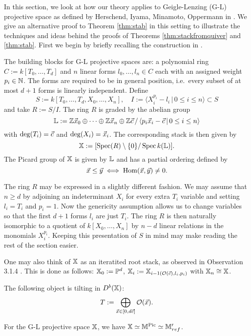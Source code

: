 \documentclass[12pt]{amsart}
\begin{document}
In this section, we look at how our theory applies to Geigle-Lenzing (G-L) projective space as defined by Herschend, Iyama, Minamoto, Oppermann in \cite{HIMO}.
We give an alternative proof to Theorem \ref{thm:stab} in this setting to illustrate the techniques and ideas behind the proofs of Theorems \ref{thm:stackfromquiver} and \ref{thm:stab}.
First we begin by briefly recalling the construction in \cite{HIMO}. 

The building blocks for G-L projective spaces are: a polynomial ring $C:= k[T_0, \ldots, T_d]$ and $n$ linear forms $l_0,\ldots,l_n \in C$ each with an assigned weight $p_i \in \mathbb{N}$. 
The forms are required to be in general position, i.e.\ every subset of at most $d+1$ forms is linearly independent. 
Define $$S:= k[T_0,\ldots, T_d, X_0, \ldots, X_n],  \quad I := \langle X_i^{p_i} - l_i \, | \, 0\leq i \leq n \rangle \subset S$$ and take $R:= S/I$. 
The ring $R$ is graded by the abelian group $$\mathbb{L}:= \mathbb{Z} {\vec{x}}_0 \oplus \cdots \oplus \mathbb{Z} {\vec{x}}_n \oplus \mathbb{Z} {\vec{c}} \,/\, \langle p_i {\vec{x}}_i - {\vec{c}} \, | \, 0\leq i \leq n \rangle$$ with $\deg(T_i)={\vec{c}}$ and $\deg(X_i) = {\vec{x}}_i$. 
The corresponding stack is then given by $$\mathbb{X}:= [\operatorname{Spec}(R) \setminus \{0\}/ \operatorname{Spec} k(\mathbb{L})].$$ 
The Picard group of $\mathbb{X}$ is given by $\mathbb{L}$ and has a partial ordering defined by $${\vec{x}} \leq {\vec{y}} \iff \operatorname{Hom}({\vec{x}}, {\vec{y}}) \neq 0.$$

The ring $R$ may be expressed in a slightly different fashion. 
We may assume that $n\geq d$ by adjoining an indeterminant $X_i$ for every extra $T_i$ variable and setting $l_i= T_i$ and $p_i=1$. 
Now the genericity assumption allows us to change variables so that the first $d+1$ forms $l_i$ are just $T_i$.
The ring $R$ is then naturally isomorphic to a quotient of $k[X_0, \ldots, X_n]$ by $n-d$ linear relations in the monomials $X_i^{p_i}$.
Keeping this presentation of $S$ in mind may make reading the rest of the section easier.

One may also think of $\mathbb{X}$ as an iteratited root stack, as observed in Observation 3.1.4 \cite{HIMO}. This is done as follows: $\mathbb{X}_0:= \mathbb{P}^d$, $\mathbb{X}_i := \mathbb{X}_{i-1 (\mathcal{O}({\vec{c}}),l_i,p_i)}$ with $\mathbb{X}_n \cong \mathbb{X}$.

\begin{theorem}\cite[Theorem 6.1.2]{HIMO}
The following object is tilting in $D^b(\mathbb{X})$: $$T:= \bigoplus_{{\vec{x}} \in [0,d{\vec{c}}]} \mathcal{O}({\vec{x}}).$$
\end{theorem}

\begin{corollary} \label{cr:HIMO}
For the G-L projective space $\mathbb{X}$, we have $\mathbb{X} \simeq \mathbb{M}^{\operatorname{Pic}} \simeq \mathbb{M}'_{ref}$.
\end{corollary}
\end{document}
